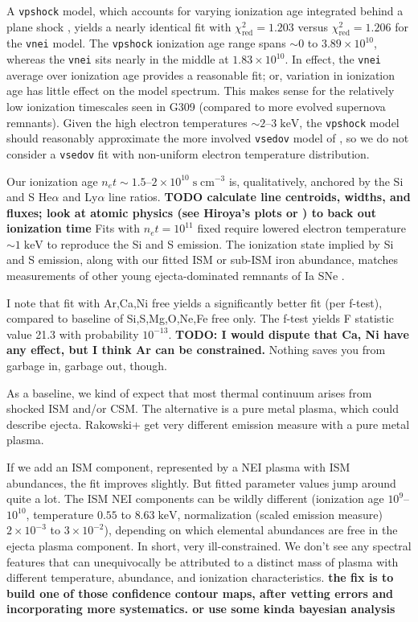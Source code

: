 \documentclass[preprint2,tighten,trackchanges]{aastex6}
\newcommand*{\mt}{\mathrm}
\newcommand*{\unit}[1]{\;\mt{#1}}  %
\newcommand*{\abt}{\mathord{\sim}} %
\begin{document}
A \texttt{vpshock} model, which accounts for varying ionization age integrated
behind a plane shock \citep{borkowski2001}, yields a nearly identical fit with
$\chi^2_{\mt{red}} = 1.203$ versus $\chi^2_{\mt{red}} = 1.206$ for the
\texttt{vnei} model.
The \texttt{vpshock} ionization age range spans
$\abt 0$ to $3.89 \times 10^{10}$, whereas the \texttt{vnei} sits nearly in the
middle at $1.83 \times 10^{10}$.
In effect, the \texttt{vnei} average over ionization age provides a reasonable
fit; or, variation in ionization age has little effect on the model spectrum.
This makes sense for the relatively low ionization timescales seen in G309
(compared to more evolved supernova remnants).
Given the high electron temperatures $\abt 2$--$3 \unit{keV}$, the
\texttt{vpshock} model should reasonably approximate the more involved
\texttt{vsedov} model of \citet{borkowski2001}, so we do not consider a
\texttt{vsedov} fit with non-uniform electron temperature distribution.

Our ionization age $n_e t \sim 1.5$--$2 \times 10^{10} \unit{s\;cm^{-3}}$
is, qualitatively, anchored by the Si and S He$\alpha$ and Ly$\alpha$ line ratios.
\textbf{TODO calculate line centroids, widths, and fluxes; look at atomic
physics (see Hiroya's plots or \citet{hwang2000}) to back out ionization time}
Fits with $n_e t = 10^{11}$ fixed require lowered
electron temperature $\sim 1 \unit{keV}$ to reproduce the Si and S emission.
The ionization state implied by Si and S emission, along with our fitted ISM or
sub-ISM iron abundance, matches measurements of other young ejecta-dominated
remnants of Ia SNe \citep[][Table 4]{badenes2007}.

I note that fit with Ar,Ca,Ni free yields a significantly better fit (per
f-test), compared to baseline of Si,S,Mg,O,Ne,Fe free only.
The f-test yields F statistic value 21.3 with probability $10^{-13}$.
\textbf{TODO: I would dispute that Ca, Ni have any effect, but I think Ar can be constrained.}
Nothing saves you from garbage in, garbage out, though.

As a baseline, we kind of expect that most thermal continuum arises from
shocked ISM and/or CSM.
The alternative is a pure metal plasma, which could describe ejecta.
Rakowski+ get very different emission measure with a pure metal plasma.

If we add an ISM component, represented by a NEI plasma with ISM abundances,
the fit improves slightly.
But fitted parameter values jump around quite a lot.
The ISM NEI components can be wildly different (ionization age
$10^{9}$--$10^{10}$, temperature $0.55$ to $8.63 \unit{keV}$,
normalization (scaled emission measure) $2 \times 10^{-3}$ to $3 \times
10^{-2}$), depending on which elemental abundances are free in the ejecta
plasma component.  In short, very ill-constrained.
We don't see any spectral features that can unequivocally be attributed to a
distinct mass of plasma with different temperature, abundance, and ionization
characteristics.
\textbf{the fix is to build one of those confidence contour maps,
after vetting errors and incorporating more systematics.
or use some kinda bayesian analysis}
\end{document}
